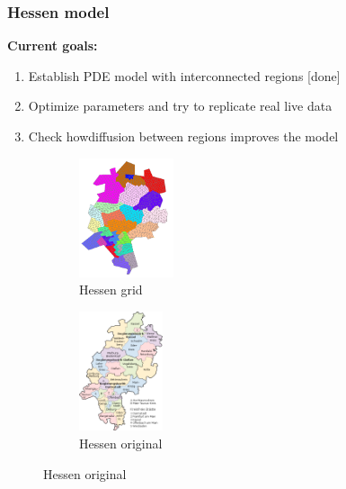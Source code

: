 \documentclass{beamer}
\begin{document}
\begin{frame}
\frametitle{Hessen model} 
	\textbf{Current goals:}
	\begin{enumerate}[$\bullet$]
		\item Establish PDE model with interconnected regions [done]
		\item Optimize parameters and try to replicate real live data\newline [in progress]
		\item Check howdiffusion between regions improves the model
	\end{enumerate}
	\begin{figure}
		\centering
		\begin{subfigure}[b]{0.45\textwidth}
			\centering
			\includegraphics[height=3.5cm]{./images/mesh2.png}
			\caption*{Hessen grid}
		\end{subfigure}
		\begin{subfigure}[b]{0.45\textwidth}
			\centering
			\includegraphics[height=3.5cm]{./images/mesh_orig.png}
				\caption*{Hessen original}
		\end{subfigure}
	\end{figure}
\end{frame}
\end{document}
